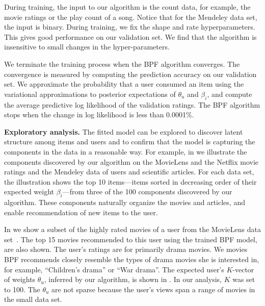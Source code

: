 During training, the input to our algorithm is the count data, for
example, the movie ratings or the play count of a song. Notice that
for the Mendeley data set, the input is binary. During training, we
fix the shape and rate hyperparameters. This gives good performance on
our validation set. We find that the algorithm is insensitive to small
changes in the hyper-parameters.


We terminate the training process when the BPF algorithm
converges. The convergence is measured by computing the prediction
accuracy on our validation set. We approximate the probability that a
user consumed an item using the variational approximations to
posterior expectations of $\theta_u$ and $\beta_i$, and compute the
average predictive log likelihood of the validation ratings. The BPF
algorithm stops when the change in log likelihood is less than
0.0001\%.

{\bf Exploratory analysis.} The fitted model can be explored to
discover latent structure among items and users and to confirm that
the model is capturing the components in the data in a reasonable
way. For example, in  we illustrate the components
discovered by our algorithm on the MovieLens and the Netflix movie
ratings and the Mendeley data of users and scientific articles. For
each data set, the illustration shows the top 10 items---items sorted
in decreasing order of their expected weight $\beta_i$---from three of
the 100 components discovered by our algorithm. These components
naturally organize the movies and articles, and enable recommendation
of new items to the user.

In  we show a subset of the highly rated
movies of a user from the MovieLens data
set~\cite{Herlocker:1999}. The top 15 movies recommended to this user
using the trained BPF model, are also shown. The user's ratings are
for primarily drama movies. We movies BPF recommends closely resemble
the types of drama movies she is interested in, for example,
``Children's drama'' or ``War drama''. The expected user's $K$-vector
of weights $\theta_u$, inferred by our algorithm, is shown in
. In our analysis, $K$ was set to
100. The $\theta_u$ are not sparse because the user's views span a
range of movies in the small data set.

